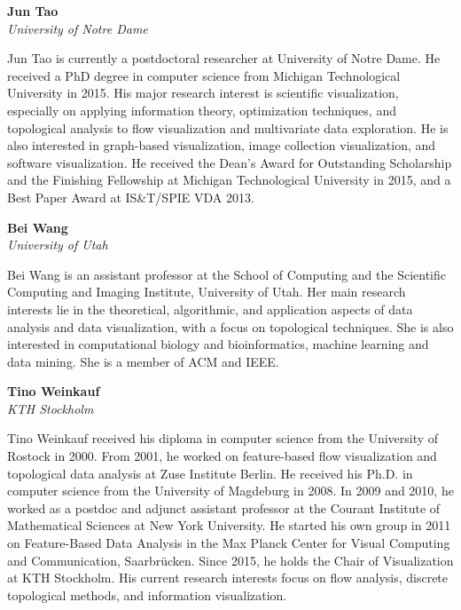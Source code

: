 \documentclass[preprint,journal]{vgtc}       %
\newcommand{\addverticalspace}{\vspace{3mm}}
\begin{document}
\printbibliography[title={Relevant Publications},category=Guo]

\noindent \textbf{Jun Tao}\\
\emph{University of Notre Dame}

\addverticalspace

Jun Tao is currently a postdoctoral researcher at University of Notre Dame. He received a PhD degree in computer science from Michigan Technological University in 2015. His major research interest is scientific visualization, especially on applying information theory, optimization techniques, and topological analysis to flow visualization and multivariate data exploration. He is also interested in graph-based visualization, image collection visualization, and software visualization. He received the Dean’s Award for Outstanding Scholarship and the Finishing Fellowship at Michigan Technological University in 2015, and a Best Paper Award at IS\&T/SPIE VDA 2013.

\printbibliography[title={Relevant Publications},category=Tao]

\noindent \textbf{Bei Wang}\\
\emph{University of Utah}

\addverticalspace
Bei Wang is an assistant professor at the School of Computing and the Scientific Computing and Imaging Institute, University of Utah. Her main research interests lie in the theoretical, algorithmic, and application aspects of data analysis and data visualization, with a focus on topological techniques. She is also interested in computational biology and bioinformatics, machine learning and data mining. She is a member of ACM and IEEE.
\addverticalspace

\printbibliography[title={Relevant Publications},category=Wang]

\noindent \textbf{Tino Weinkauf}\\
\emph{KTH Stockholm}

\addverticalspace
Tino Weinkauf received his diploma in computer science from the University of Rostock in 2000. From 2001, he worked on feature-based flow visualization and topological data analysis at Zuse Institute Berlin. He received his Ph.D. in computer science from the University of Magdeburg in 2008. In 2009 and 2010, he worked as a postdoc and adjunct assistant professor at the Courant Institute of Mathematical Sciences at New York University. He started his own group in 2011 on Feature-Based Data Analysis in the Max Planck Center for Visual Computing and Communication, Saarbrücken. Since 2015, he holds the Chair of Visualization at KTH Stockholm. His current research interests focus on flow analysis, discrete topological methods, and information visualization.
\end{document}
